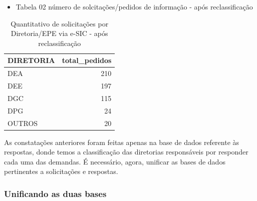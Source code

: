 \documentclass[]{article}
\newenvironment{Shaded}{\begin{snugshade}}{\end{snugshade}}
\newcommand{\KeywordTok}[1]{\textcolor[rgb]{0.13,0.29,0.53}{\textbf{#1}}}
\newcommand{\DataTypeTok}[1]{\textcolor[rgb]{0.13,0.29,0.53}{#1}}
\newcommand{\StringTok}[1]{\textcolor[rgb]{0.31,0.60,0.02}{#1}}
\newcommand{\OtherTok}[1]{\textcolor[rgb]{0.56,0.35,0.01}{#1}}
\newcommand{\OperatorTok}[1]{\textcolor[rgb]{0.81,0.36,0.00}{\textbf{#1}}}
\newcommand{\NormalTok}[1]{#1}
\providecommand{\tightlist}{%
  \setlength{\itemsep}{0pt}\setlength{\parskip}{0pt}}
\begin{document}
\begin{itemize}
\tightlist
\item
  Tabela 02 número de solcitações/pedidos de informação - após
  reclassificação
\end{itemize}

\begin{Shaded}
\end{Shaded}

\begin{table}[!h]

\caption{\label{tab:unnamed-chunk-15}Quantitativo de solicitações por Diretoria/EPE via e-SIC - após reclassificação}
\centering
\begin{tabular}{lr}
\toprule
DIRETORIA & total\_pedidos\\
\midrule
\rowcolor{gray!6}  DEA & 210\\
DEE & 197\\
\rowcolor{gray!6}  DGC & 115\\
DPG & 24\\
\rowcolor{gray!6}  OUTROS & 20\\
\bottomrule
\end{tabular}
\end{table}

As constatações anteriores foram feitas apenas na base de dados
referente às respostas, donde temos a classificação das diretorias
responsáveis por responder cada uma das demandas. É necessário, agora,
unificar as bases de dados pertinentes a solicitações e respostas.

\subsubsection{Unificando as duas bases}\label{unificando-as-duas-bases}
\end{document}
